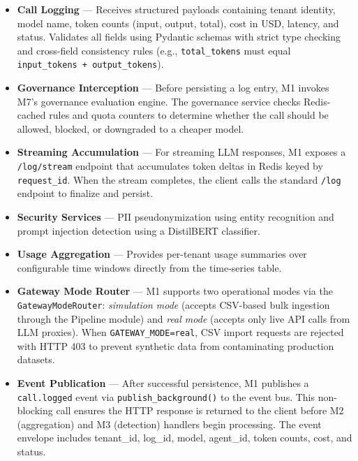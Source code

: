 \documentclass[12pt,a4paper,twoside]{report}
\begin{document}
\begin{itemize}
  \item \textbf{Call Logging} — Receives structured payloads containing tenant identity, model name, token counts (input, output, total), cost in USD, latency, and status. Validates all fields using Pydantic schemas with strict type checking and cross-field consistency rules (e.g., \texttt{total\_tokens} must equal \texttt{input\_tokens + output\_tokens}).

  \item \textbf{Governance Interception} — Before persisting a log entry, M1 invokes M7's governance evaluation engine. The governance service checks Redis-cached rules and quota counters to determine whether the call should be allowed, blocked, or downgraded to a cheaper model.

  \item \textbf{Streaming Accumulation} — For streaming LLM responses, M1 exposes a \texttt{/log/stream} endpoint that accumulates token deltas in Redis keyed by \texttt{request\_id}. When the stream completes, the client calls the standard \texttt{/log} endpoint to finalize and persist.

  \item \textbf{Security Services} --- PII pseudonymization using entity recognition and prompt injection detection using a DistilBERT classifier.

  \item \textbf{Usage Aggregation} --- Provides per-tenant usage summaries over configurable time windows directly from the time-series table.

  \item \textbf{Gateway Mode Router} --- M1 supports two operational modes via the \texttt{GatewayModeRouter}: \textit{simulation mode} (accepts CSV-based bulk ingestion through the Pipeline module) and \textit{real mode} (accepts only live API calls from LLM proxies). When \texttt{GATEWAY\_MODE=real}, CSV import requests are rejected with HTTP 403 to prevent synthetic data from contaminating production datasets.

  \item \textbf{Event Publication} --- After successful persistence, M1 publishes a \texttt{call.logged} event via \texttt{publish\_background()} to the event bus. This non-blocking call ensures the HTTP response is returned to the client before M2 (aggregation) and M3 (detection) handlers begin processing. The event envelope includes tenant\_id, log\_id, model, agent\_id, token counts, cost, and status.
\end{itemize}
\end{document}
